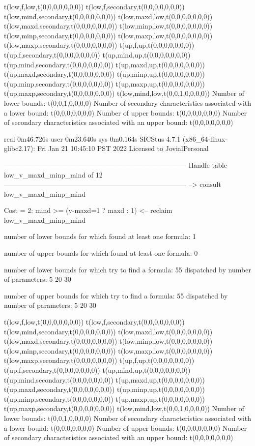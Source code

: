 t(low,f,low,t(0,0,0,0,0,0,0))
t(low,f,secondary,t(0,0,0,0,0,0,0))
t(low,mind,secondary,t(0,0,0,0,0,0,0))
t(low,maxd,low,t(0,0,0,0,0,0,0))
t(low,maxd,secondary,t(0,0,0,0,0,0,0))
t(low,minp,low,t(0,0,0,0,0,0,0))
t(low,minp,secondary,t(0,0,0,0,0,0,0))
t(low,maxp,low,t(0,0,0,0,0,0,0))
t(low,maxp,secondary,t(0,0,0,0,0,0,0))
t(up,f,up,t(0,0,0,0,0,0,0))
t(up,f,secondary,t(0,0,0,0,0,0,0))
t(up,mind,up,t(0,0,0,0,0,0,0))
t(up,mind,secondary,t(0,0,0,0,0,0,0))
t(up,maxd,up,t(0,0,0,0,0,0,0))
t(up,maxd,secondary,t(0,0,0,0,0,0,0))
t(up,minp,up,t(0,0,0,0,0,0,0))
t(up,minp,secondary,t(0,0,0,0,0,0,0))
t(up,maxp,up,t(0,0,0,0,0,0,0))
t(up,maxp,secondary,t(0,0,0,0,0,0,0))
t(low,mind,low,t(0,0,1,0,0,0,0))
Number of lower bounds:                                             t(0,0,1,0,0,0,0)
Number of secondary characteristics associated with a lower bound:  t(0,0,0,0,0,0,0)
Number of upper bounds:                                             t(0,0,0,0,0,0,0)
Number of secondary characteristics associated with an upper bound: t(0,0,0,0,0,0,0)

real	0m46.726s
user	0m23.640s
sys	0m0.164s
SICStus 4.7.1 (x86_64-linux-glibc2.17): Fri Jan 21 10:45:10 PST 2022
Licensed to JovialPersonal


--------------------------------------------------------------------------------
Handle table low_v_maxd_minp_mind of 12
--------------------------------------------------------------------------------
--> consult low_v_maxd_minp_mind

Cost =  2:  mind >= (v-maxd=1 ? maxd : 1)
<-- reclaim low_v_maxd_minp_mind

number of lower bounds for which found at least one formula: 1

number of upper bounds for which found at least one formula: 0

number of lower bounds for which try to find a formula: 55
dispatched by number of parameters: 5  20  30

number of upper bounds for which try to find a formula: 55
dispatched by number of parameters: 5  20  30

t(low,f,low,t(0,0,0,0,0,0,0))
t(low,f,secondary,t(0,0,0,0,0,0,0))
t(low,mind,secondary,t(0,0,0,0,0,0,0))
t(low,maxd,low,t(0,0,0,0,0,0,0))
t(low,maxd,secondary,t(0,0,0,0,0,0,0))
t(low,minp,low,t(0,0,0,0,0,0,0))
t(low,minp,secondary,t(0,0,0,0,0,0,0))
t(low,maxp,low,t(0,0,0,0,0,0,0))
t(low,maxp,secondary,t(0,0,0,0,0,0,0))
t(up,f,up,t(0,0,0,0,0,0,0))
t(up,f,secondary,t(0,0,0,0,0,0,0))
t(up,mind,up,t(0,0,0,0,0,0,0))
t(up,mind,secondary,t(0,0,0,0,0,0,0))
t(up,maxd,up,t(0,0,0,0,0,0,0))
t(up,maxd,secondary,t(0,0,0,0,0,0,0))
t(up,minp,up,t(0,0,0,0,0,0,0))
t(up,minp,secondary,t(0,0,0,0,0,0,0))
t(up,maxp,up,t(0,0,0,0,0,0,0))
t(up,maxp,secondary,t(0,0,0,0,0,0,0))
t(low,mind,low,t(0,0,1,0,0,0,0))
Number of lower bounds:                                             t(0,0,1,0,0,0,0)
Number of secondary characteristics associated with a lower bound:  t(0,0,0,0,0,0,0)
Number of upper bounds:                                             t(0,0,0,0,0,0,0)
Number of secondary characteristics associated with an upper bound: t(0,0,0,0,0,0,0)

